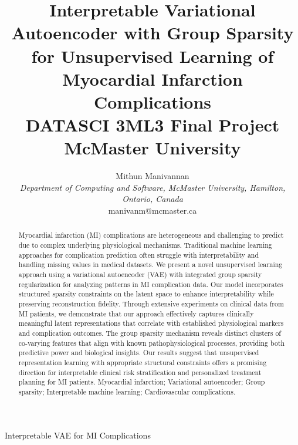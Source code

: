 \documentclass[oupdraft]{bio}
\begin{document}
\title{Interpretable Variational Autoencoder with Group Sparsity for Unsupervised Learning of Myocardial Infarction Complications\\[8pt]
{\normalsize DATASCI 3ML3 Final Project\\McMaster University}}

\author{Mithun Manivannan\\[4pt]
\textit{Department of Computing and Software,
McMaster University,
Hamilton, Ontario,
Canada}
\\[2pt]
{manivanm@mcmaster.ca}}

{Interpretable VAE for MI Complications}

\maketitle

\begin{abstract}
{Myocardial infarction (MI) complications are heterogeneous and challenging to predict due to complex underlying physiological mechanisms. Traditional machine learning approaches for complication prediction often struggle with interpretability and handling missing values in medical datasets. We present a novel unsupervised learning approach using a variational autoencoder (VAE) with integrated group sparsity regularization for analyzing patterns in MI complication data. Our model incorporates structured sparsity constraints on the latent space to enhance interpretability while preserving reconstruction fidelity. Through extensive experiments on clinical data from MI patients, we demonstrate that our approach effectively captures clinically meaningful latent representations that correlate with established physiological markers and complication outcomes. The group sparsity mechanism reveals distinct clusters of co-varying features that align with known pathophysiological processes, providing both predictive power and biological insights. Our results suggest that unsupervised representation learning with appropriate structural constraints offers a promising direction for interpretable clinical risk stratification and personalized treatment planning for MI patients.}
{Myocardial infarction; Variational autoencoder; Group sparsity; Interpretable machine learning; Cardiovascular complications.}
\end{abstract}
\end{document}
